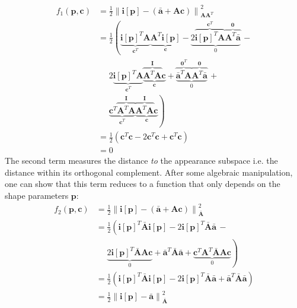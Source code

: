 \begin{equation}
    \begin{aligned}
        f_1(\mathbf{p}, \mathbf{c}) & = \frac{1}{2}\left\| \mathbf{i}[\mathbf{p}] - \left( \bar{\mathbf{a}} + \mathbf{A} \mathbf{c} \right) \right\|_{\mathbf{A}\mathbf{A}^T}^2
        \\
        & = \frac{1}{2} \left( \underbrace{\mathbf{i}[\mathbf{p}]^T \mathbf{A}}_{\mathbf{c}^T} \underbrace{\mathbf{A}^T \mathbf{i}[\mathbf{p}]}_{\mathbf{c}} - \underbrace{2\overbrace{\mathbf{i}[\mathbf{p}]^T \mathbf{A}}^{\mathbf{c}^T} \overbrace{\mathbf{A}^T \bar{\mathbf{a}}}^{\mathbf{0}}}_{0} \, - \right.
        \\
        & \quad \,\, 2\underbrace{\mathbf{i}[\mathbf{p}]^T \mathbf{A}}_{\mathbf{c}^T} \underbrace{\overbrace{\mathbf{A}^T \mathbf{A}}^{\mathbf{I}} \mathbf{c}}_{\mathbf{c}} + \underbrace{\overbrace{\bar{\mathbf{a}}^T \mathbf{A}}^{\mathbf{0}^T} \overbrace{\mathbf{A}^T \bar{\mathbf{a}}}^{\mathbf{0}}}_{0} \, +
        \\
        & \quad \,\, \left. \underbrace{\mathbf{c}^T \overbrace{\mathbf{A}^T \mathbf{A}}^{\mathbf{I}}}_{\mathbf{c}^T} \underbrace{\overbrace{\mathbf{A}^T \mathbf{A}}^{\mathbf{I}} \mathbf{c}}_{\mathbf{c}} \right)
        \\
        & = \frac{1}{2}(\mathbf{c}^T\mathbf{c} - 2\mathbf{c}^T\mathbf{c} + \mathbf{c}^T\mathbf{c})
        \\
        & = 0
    \label{eq:ssd_term1}
    \end{aligned}
\end{equation}
The second term measures the distance \emph{to} the appearance subspace i.e. the distance within its orthogonal complement. After some algebraic manipulation, one can show that this term reduces to a function that only depends on the shape parameters $\mathbf{p}$:
\begin{equation}
    \begin{aligned}
        f_2(\mathbf{p}, \mathbf{c}) & = \frac{1}{2}\left\| \mathbf{i}[\mathbf{p}] - \left( \bar{\mathbf{a}} + \mathbf{A} \mathbf{c} \right) \right\|_{\bar{\mathbf{A}}}^2
        \\
        & = \frac{1}{2} \left( \mathbf{i}[\mathbf{p}]^T \bar{\mathbf{A}} \mathbf{i}[\mathbf{p}] - 2\mathbf{i}[\mathbf{p}]^T \bar{\mathbf{A}} \bar{\mathbf{a}} \, - \right.
        \\
        & \quad \,\, \left. \underbrace{2\mathbf{i}[\mathbf{p}]^T \bar{\mathbf{A}} \mathbf{A}\mathbf{c}}_{0} + \bar{\mathbf{a}}^T \bar{\mathbf{A}} \bar{\mathbf{a}} + \underbrace{\mathbf{c}^T \mathbf{A}^T \bar{\mathbf{A}} \mathbf{A}\mathbf{c}}_{0} \right)
        \\
        & = \frac{1}{2} (\mathbf{i}[\mathbf{p}]^T \bar{\mathbf{A}} \mathbf{i}[\mathbf{p}] - 2\mathbf{i}[\mathbf{p}]^T \bar{\mathbf{A}} \bar{\mathbf{a}} + \bar{\mathbf{a}}^T \bar{\mathbf{A}} \bar{\mathbf{a}} )
        \\
        & = \frac{1}{2} \left\| \mathbf{i}[\mathbf{p}] - \bar{\mathbf{a}} \right\|_{\bar{\mathbf{A}}}^2
    \label{eq:ssd_term2}
    \end{aligned}
\end{equation}
